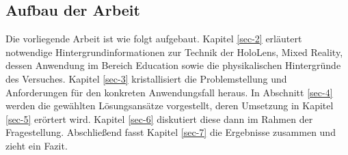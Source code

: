 \begin{comment}
\subsection{Aufgabenstellung}

Im Rahmen der Arbeit soll anhand der HoloLens untersucht werden, wie diese in der Physik-Lehre eingesetzt werden kann, um physikalische Inhalte zu vermitteln. Insbesondere soll betrachtet werden, wie physikalische Experimente mittels Mixed Reality Anwendungen durch zusätzliche Inhalte angereichert werden können.\\

\par
Dazu sind zunächst die technischen Möglichkeiten und Voraussetzungen der HoloLens zu betrachten und in Zusammenhang mit dem Anwendungsfall zu bringen. Weiterhin sind bestehende Ansätze im Einsatz von Mixed Reality Technologie in der Lehre, besonders in der Physik-Lehre, herauszuarbeiten und einzuordnen.

Davon ausgehend soll der Fragestellung anhand eines konkreten Beispiels nachgegangen werden. Für einen ausgewählten Versuchsaufbau sind die darzustellenden Objekte und Informationen sowie das Zusammenspiel dieser mit dem aufgebauten Experiment, der Umgebung und den Nutzern zu entwickeln. Für den ausgewählten Anwendungsfall soll eine Umsetzung mit der HoloLens konzipiert, designet und prototypisch implementiert werden.
\end{comment}

\subsection{Aufbau der Arbeit}
\label{sec-1-3}
Die vorliegende Arbeit ist wie folgt aufgebaut. Kapitel \ref{sec-2} erläutert notwendige Hintergrundinformationen zur Technik der HoloLens, Mixed Reality, dessen Anwendung im Bereich Education sowie die physikalischen Hintergründe des Versuches.  Kapitel \ref{sec-3} kristallisiert die Problemstellung und Anforderungen für den konkreten Anwendungsfall heraus. In Abschnitt \ref{sec-4} werden die gewählten Lösungsansätze vorgestellt, deren Umsetzung in Kapitel \ref{sec-5} erörtert wird. Kapitel \ref{sec-6} diskutiert diese dann im Rahmen der Fragestellung. Abschließend fasst Kapitel \ref{sec-7} die Ergebnisse zusammen und zieht ein Fazit.